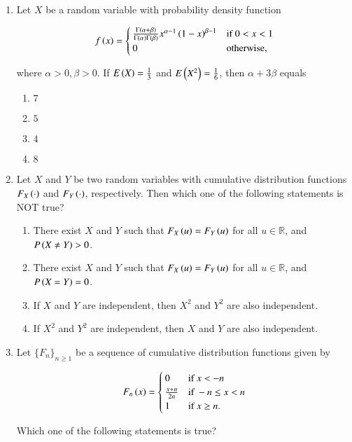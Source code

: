\documentclass[journal]{IEEEtran}
\numberwithin{equation}{enumi}
\numberwithin{figure}{enumi}
\newcommand{\lt}{<}
\newcommand{\gt}{>}
\begin{document}
\begin{enumerate}
\item Let $X$ be a random variable with probability density function

\[
f\brak{x} = \begin{cases}
\frac{\Gamma\brak{\alpha+\beta}}{\Gamma\brak{\alpha}\Gamma\brak{\beta}}x^{\alpha-1}\brak{1-x}^{\beta-1} & \text{if } 0 \lt x \lt 1 \\
0 & \text{otherwise,}
\end{cases} 
\]

where $\alpha \gt 0, \beta \gt 0$. If $E\left(X\right) = \frac{1}{3}$ and $E\left(X^2\right) = \frac{1}{6}$, then $\alpha + 3\beta$ equals

\begin{enumerate}
    \item $7$
    \item $5$
    \item $4$
    \item $8$
\end{enumerate}

\item Let $X$ and $Y$ be two random variables with cumulative distribution functions $F_X\left(\cdot\right)$ and $F_Y\left(\cdot\right)$, respectively. Then which one of the following statements is NOT true?

\begin{enumerate}
    \item There exist $X$ and $Y$ such that $F_X\left(u\right) = F_Y\left(u\right)$ for all $u \in \mathbb{R}$, and $P\brak{X \neq Y} \gt 0$.
    \item There exist $X$ and $Y$ such that $F_X\left(u\right) = F_Y\left(u\right)$ for all $u \in \mathbb{R}$, and $P\left(X = Y\right) = 0$.
    \item If $X$ and $Y$ are independent, then $X^2$ and $Y^2$ are also independent.
    \item If $X^2$ and $Y^2$ are independent, then $X$ and $Y$ are also independent.
\end{enumerate}

\item Let $\{F_n\}_{n\geq1}$ be a sequence of cumulative distribution functions given by 

\[
F_n\brak{x} = \begin{cases}
0 & \text{if } x \lt -n \\
\frac{x+n}{2n} & \text{if } -n \leq x \lt n \\
1 & \text{if } x \geq n.
\end{cases}
\]

Which one of the following statements is true?


\end{enumerate}
\end{document}
